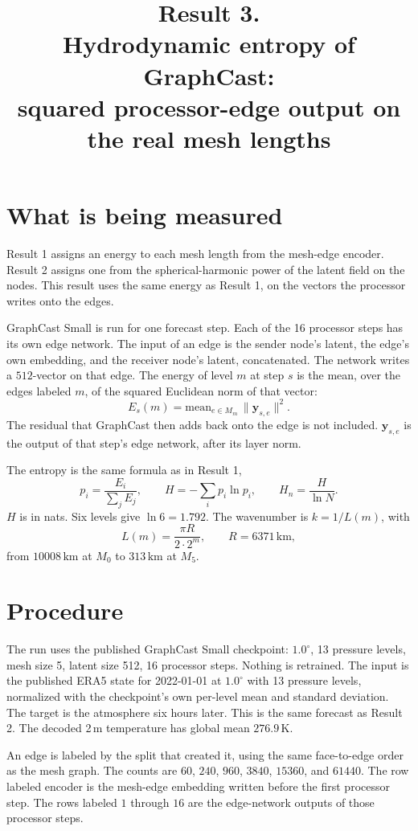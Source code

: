 \documentclass[11pt]{article}
\title{Result 3.\\
Hydrodynamic entropy of GraphCast:\\
squared processor-edge output on the real mesh lengths}
\author{}
\date{}
\begin{document}
\maketitle

\section{What is being measured}

Result 1 assigns an energy to each mesh length from the mesh-edge encoder. Result 2 assigns one from the spherical-harmonic power of the latent field on the nodes. This result uses the same energy as Result 1, on the vectors the processor writes onto the edges.

GraphCast Small is run for one forecast step. Each of the 16 processor steps has its own edge network. The input of an edge is the sender node's latent, the edge's own embedding, and the receiver node's latent, concatenated. The network writes a \(512\)-vector on that edge. The energy of level \(m\) at step \(s\) is the mean, over the edges labeled \(m\), of the squared Euclidean norm of that vector:
\[
E_s(m) = \mathrm{mean}_{e \in M_m}\,\|\mathbf{y}_{s,e}\|^2.
\]
The residual that GraphCast then adds back onto the edge is not included. \(\mathbf{y}_{s,e}\) is the output of that step's edge network, after its layer norm.

The entropy is the same formula as in Result 1,
\[
p_i = \frac{E_i}{\sum_j E_j},
\qquad
H = -\sum_i p_i \ln p_i,
\qquad
H_n = \frac{H}{\ln N}.
\]
\(H\) is in nats. Six levels give \(\ln 6 = 1.792\). The wavenumber is \(k = 1/L(m)\), with
\[
L(m) = \frac{\pi R}{2 \cdot 2^{m}}, \qquad R = 6371\,\mathrm{km},
\]
from \(10008\,\mathrm{km}\) at \(M_0\) to \(313\,\mathrm{km}\) at \(M_5\).

\section{Procedure}

The run uses the published GraphCast Small checkpoint: \(1.0^\circ\), 13 pressure levels, mesh size 5, latent size 512, 16 processor steps. Nothing is retrained. The input is the published ERA5 state for 2022-01-01 at \(1.0^\circ\) with 13 pressure levels, normalized with the checkpoint's own per-level mean and standard deviation. The target is the atmosphere six hours later. This is the same forecast as Result 2. The decoded 2\,m temperature has global mean \(276.9\,\mathrm{K}\).

An edge is labeled by the split that created it, using the same face-to-edge order as the mesh graph. The counts are \(60\), \(240\), \(960\), \(3840\), \(15360\), and \(61440\). The row labeled encoder is the mesh-edge embedding written before the first processor step. The rows labeled \(1\) through \(16\) are the edge-network outputs of those processor steps.
\end{document}

